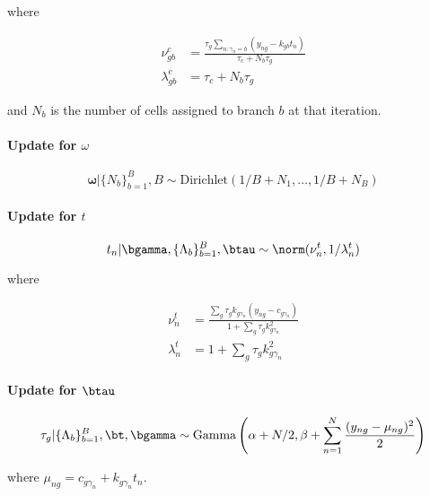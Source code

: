 where

\begin{equation}
\begin{aligned}
\nu^c_{gb} & = \frac{\tau_g \sum_{n:\gamma_n = b} (y_{ng} - k_{gb} t_n)}{\tau_c + N_b \tau_g}\\
\lambda^c_{gb} & = \tau_c + N_b \tau_g
\end{aligned}
\end{equation}

and $N_b$ is the number of cells assigned to branch $b$ at that iteration.

\paragraph{Update for $\omega$}

\begin{equation}
  \bm \omega | \{N_b\}_{b=1}^B, B \sim \text{Dirichlet}(1/B + N_1, \ldots, 1/B + N_B)
\end{equation}

\paragraph{Update for $t$}

\begin{equation}
  t_n | \bgamma, \{ \Lambda_b \}_{b=1}^B, \btau \sim \norm(\nu^t_n, 1 / \lambda^t_n)
\end{equation}

where

\begin{equation}
\begin{aligned}
\nu^t_{n} & = \frac{\sum_g \tau_g k_{g\gamma_n} (y_{ng} - c_{g\gamma_n})}
{1 + \sum_g \tau_g k_{g\gamma_n}^2} \\
\lambda^t_{n} & = 1 + \sum_g \tau_g k_{g\gamma_n}^2
\end{aligned}
\end{equation}

\paragraph{Update for $\btau$}

\begin{equation}
\tau_g |  \{ \Lambda_b \}_{b=1}^B, \bt, \bgamma \sim \text{Gamma}\left( \alpha + N / 2,
\beta + \sum_{n=1}^N \frac{(y_{ng} - \mu_{ng})^2}{2}
\right)
\end{equation}

where $\mu_{ng} = c_{g\gamma_n} + k_{g\gamma_n} t_n$.

